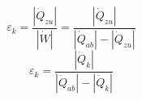 

\item[d)] 
    \[
    \varepsilon_k = \frac{|\dot{Q}_{zu}|}{|\dot{W}|} = \frac{|\dot{Q}_{zu}|}{|\dot{Q}_{ab}| - |\dot{Q}_{zu}|}
    \]
    \[
    \varepsilon_k = \frac{|\dot{Q}_k|}{|\dot{Q}_{ab}| - |\dot{Q}_k|}
    \]